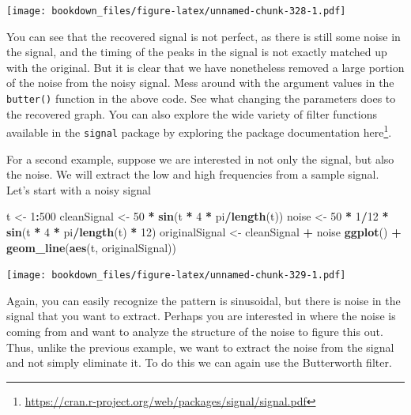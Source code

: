 \documentclass[
]{krantz}
\makeatletter
\newenvironment{Shaded}{\begin{snugshade}}{\end{snugshade}}
\newcommand{\DecValTok}[1]{\textcolor[rgb]{0.06,0.06,0.06}{#1}}
\newcommand{\KeywordTok}[1]{\textcolor[rgb]{0.27,0.27,0.27}{\textbf{#1}}}
\newcommand{\NormalTok}[1]{#1}
\newcommand{\OperatorTok}[1]{\textcolor[rgb]{0.43,0.43,0.43}{\textbf{#1}}}
\newcommand{\StringTok}[1]{\textcolor[rgb]{0.5,0.5,0.5}{#1}}
\renewcommand{\href}[2]{#2\footnote{\url{#1}}}
\newenvironment{kframe}{%
\medskip{}
\setlength{\fboxsep}{.8em}
 \def\at@end@of@kframe{}%
 \ifinner\ifhmode%
  \def\at@end@of@kframe{\end{minipage}}%
  \begin{minipage}{\columnwidth}%
 \fi\fi%
 \def\FrameCommand##1{\hskip\@totalleftmargin \hskip-\fboxsep
 \colorbox{shadecolor}{##1}\hskip-\fboxsep
     \hskip-\linewidth \hskip-\@totalleftmargin \hskip\columnwidth}%
 \MakeFramed {\advance\hsize-\width
   \@totalleftmargin\z@ \linewidth\hsize
   \@setminipage}}%
 {\par\unskip\endMakeFramed%
 \at@end@of@kframe}
\renewenvironment{Shaded}{\begin{kframe}}{\end{kframe}}
\makeatother
\begin{document}
\texttt{[image: bookdown\_files/figure-latex/unnamed-chunk-328-1.pdf]}

You can see that the recovered signal is not perfect, as there is still some noise in the signal, and the timing of the peaks in the signal is not exactly matched up with the original. But it is clear that we have nonetheless removed a large portion of the noise from the noisy signal. Mess around with the argument values in the \texttt{butter()} function in the above code. See what changing the parameters does to the recovered graph. You can also explore the wide variety of filter functions available in the \texttt{signal} package by exploring the package documentation \href{https://cran.r-project.org/web/packages/signal/signal.pdf}{here}.

For a second example, suppose we are interested in not only the signal, but also the noise. We will extract the low and high frequencies from a sample signal. Let's start with a noisy signal

\begin{Shaded}
\begin{Highlighting}[]
\NormalTok{t \textless{}{-}}\StringTok{ }\DecValTok{1}\OperatorTok{:}\DecValTok{500}
\NormalTok{cleanSignal \textless{}{-}}\StringTok{ }\DecValTok{50} \OperatorTok{*}\StringTok{ }\KeywordTok{sin}\NormalTok{(t }\OperatorTok{*}\StringTok{ }\DecValTok{4} \OperatorTok{*}\StringTok{ }\NormalTok{pi}\OperatorTok{/}\KeywordTok{length}\NormalTok{(t))}
\NormalTok{noise \textless{}{-}}\StringTok{ }\DecValTok{50} \OperatorTok{*}\StringTok{ }\DecValTok{1}\OperatorTok{/}\DecValTok{12} \OperatorTok{*}\StringTok{ }\KeywordTok{sin}\NormalTok{(t }\OperatorTok{*}\StringTok{ }\DecValTok{4} \OperatorTok{*}\StringTok{ }\NormalTok{pi}\OperatorTok{/}\KeywordTok{length}\NormalTok{(t) }\OperatorTok{*}\StringTok{ }\DecValTok{12}\NormalTok{)}
\NormalTok{originalSignal \textless{}{-}}\StringTok{ }\NormalTok{cleanSignal }\OperatorTok{+}\StringTok{ }\NormalTok{noise}
\KeywordTok{ggplot}\NormalTok{() }\OperatorTok{+}\StringTok{ }
\StringTok{  }\KeywordTok{geom\_line}\NormalTok{(}\KeywordTok{aes}\NormalTok{(t, originalSignal))}
\end{Highlighting}
\end{Shaded}

\texttt{[image: bookdown\_files/figure-latex/unnamed-chunk-329-1.pdf]}

Again, you can easily recognize the pattern is sinusoidal, but there is noise in the signal that you want to extract. Perhaps you are interested in where the noise is coming from and want to analyze the structure of the noise to figure this out. Thus, unlike the previous example, we want to extract the noise from the signal and not simply eliminate it. To do this we can again use the Butterworth filter.
\end{document}
